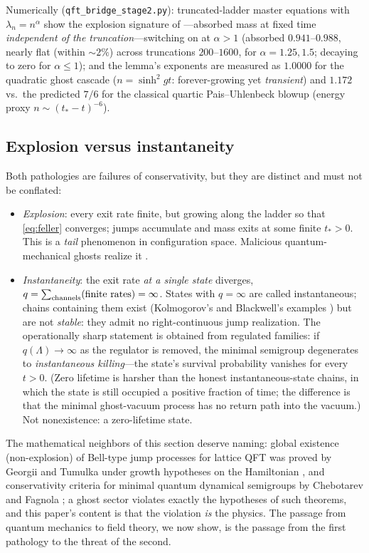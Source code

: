 \documentclass[11pt]{article}
\theoremstyle{definition}
\theoremstyle{remark}
\begin{document}
Numerically (\texttt{qft\_bridge\_stage2.py}): truncated-ladder
master equations with $\lambda_n=n^\alpha$ show the explosion
signature of \cite{indivisible}---absorbed mass at fixed time
\emph{independent of the truncation}---switching on at $\alpha>1$
(absorbed $0.941$--$0.988$, nearly flat (within $\sim2\%$) across truncations $200$--$1600$,
for $\alpha=1.25,1.5$; decaying to zero for $\alpha\le1$); and the
lemma's exponents are measured as $1.0000$ for the quadratic ghost
cascade ($n=\sinh^2 gt$: forever-growing yet \emph{transient}) and
$1.172$ vs.\ the predicted $7/6$ for the classical quartic
Pais--Uhlenbeck blowup (energy proxy $n\sim(t_*-t)^{-6}$).

\subsection{Explosion versus instantaneity}
\label{sec:taxonomy}

Both pathologies are failures of conservativity, but they are
distinct and must not be conflated:

\begin{itemize}
\item \emph{Explosion}: every exit rate finite, but growing along
the ladder so that \eqref{eq:feller} converges; jumps accumulate and
mass exits at some finite $t_*>0$. This is a \emph{tail} phenomenon
in configuration space. Malicious quantum-mechanical ghosts realize
it \cite{indivisible}.
\item \emph{Instantaneity}: the exit rate \emph{at a single state}
diverges, $q=\sum_{\rm channels}(\text{finite rates})=\infty$. States
with $q=\infty$ are called instantaneous; chains containing them
exist (Kolmogorov's and Blackwell's examples
\cite{Blackwell1958,ChungBook}) but are not \emph{stable}: they
admit no right-continuous jump realization. The operationally sharp
statement is obtained from regulated families: if
$q(\Lambda)\to\infty$ as the regulator is removed, the minimal
semigroup degenerates to \emph{instantaneous killing}---the state's
survival probability vanishes for every $t>0$. (Zero lifetime is
harsher than the honest instantaneous-state chains, in which the
state is still occupied a positive fraction of time; the difference
is that the minimal ghost-vacuum process has no return path into
the vacuum.) Not nonexistence: a zero-lifetime state.
\end{itemize}

The mathematical neighbors of this section deserve naming: global
existence (non-explosion) of Bell-type jump processes for lattice
QFT was proved by Georgii and Tumulka under growth hypotheses on
the Hamiltonian \cite{GeorgiiTumulka}, and conservativity criteria
for minimal quantum dynamical semigroups by Chebotarev and Fagnola
\cite{ChebotarevFagnola}; a ghost sector violates exactly the
hypotheses of such theorems, and this paper's content is that the
violation \emph{is} the physics. The passage from quantum mechanics
to field theory, we now show, is the passage from the first
pathology to the threat of the second.
\end{document}
